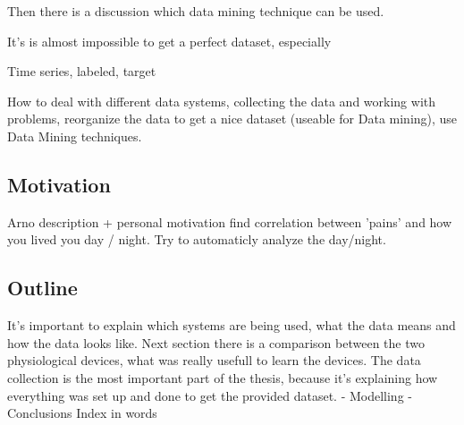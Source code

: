 		Then there is a discussion which data mining technique can be used. 


		It's is almost impossible to get a perfect dataset, especially 
			
		Time series, labeled, target

		How to deal with different data systems, collecting the data and working with problems, reorganize the data to get a nice dataset (useable for Data mining), use Data Mining techniques.
	\subsection{Motivation}
		Arno description + personal motivation
		find correlation between 'pains' and how you lived you day / night. 
		Try to automaticly analyze the day/night.

	\subsection{Outline}
		It's important to explain which systems are being used, what the data means and how the data looks like. Next section there is a comparison between the two physiological devices, what was really usefull to learn the devices. The data collection is the most important part of the thesis, because it's explaining how everything was set up and done to get the provided dataset. - Modelling - Conclusions 
		Index in words
